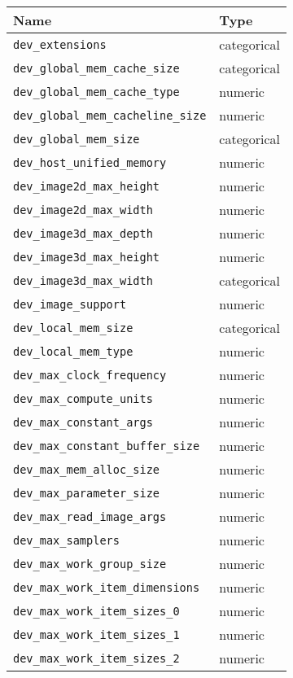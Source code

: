 \begin{tabular}{ll}
  \toprule
  Name & Type \\
  \midrule
  \texttt{dev\_extensions} & categorical \\
  \texttt{dev\_global\_mem\_cache\_size} & categorical \\
  \texttt{dev\_global\_mem\_cache\_type} & numeric \\
  \texttt{dev\_global\_mem\_cacheline\_size} & numeric \\
  \texttt{dev\_global\_mem\_size} & categorical \\
  \texttt{dev\_host\_unified\_memory} & numeric \\
  \texttt{dev\_image2d\_max\_height} & numeric \\
  \texttt{dev\_image2d\_max\_width} & numeric \\
  \texttt{dev\_image3d\_max\_depth} & numeric \\
  \texttt{dev\_image3d\_max\_height} & numeric \\
  \texttt{dev\_image3d\_max\_width} & categorical \\
  \texttt{dev\_image\_support} & numeric \\
  \texttt{dev\_local\_mem\_size} & categorical \\
  \texttt{dev\_local\_mem\_type} & numeric \\
  \texttt{dev\_max\_clock\_frequency} & numeric \\
  \texttt{dev\_max\_compute\_units} & numeric \\
  \texttt{dev\_max\_constant\_args} & numeric \\
  \texttt{dev\_max\_constant\_buffer\_size} & numeric \\
  \texttt{dev\_max\_mem\_alloc\_size} & numeric \\
  \texttt{dev\_max\_parameter\_size} & numeric \\
  \texttt{dev\_max\_read\_image\_args} & numeric \\
  \texttt{dev\_max\_samplers} & numeric \\
  \texttt{dev\_max\_work\_group\_size} & numeric \\
  \texttt{dev\_max\_work\_item\_dimensions} & numeric \\
  \texttt{dev\_max\_work\_item\_sizes\_0} & numeric \\
  \texttt{dev\_max\_work\_item\_sizes\_1} & numeric \\
  \texttt{dev\_max\_work\_item\_sizes\_2} & numeric \\

\end{tabular}
